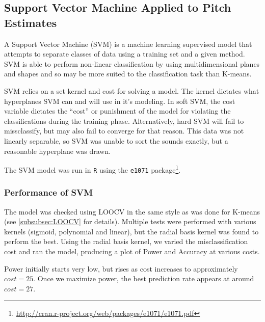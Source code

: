 \documentclass[paper=a4, fontsize=11pt]{scrartcl}
\numberwithin{equation}{section}
\numberwithin{figure}{section}
\numberwithin{table}{section}
\begin{document}
\subsection{Support Vector Machine Applied to Pitch Estimates}
A Support Vector Machine (SVM) is a machine learning supervised model that attempts to separate classes of data using a training set and a given method. SVM is able to perform non-linear classification by using multidimensional planes and shapes and so may be more suited to the classification task than K-means.

\noindent SVM relies on a set kernel and cost for solving a model. The kernel dictates what hyperplanes SVM can and will use in it's modeling. In soft SVM, the cost variable dictates the ``cost'' or punishment of the model for violating the classifications during the training phase. Alternatively, hard SVM will fail to missclassify, but may also fail to converge for that reason. This data was not linearly separable, so SVM was unable to sort the sounds exactly, but a reasonable hyperplane was drawn.

\noindent The SVM model was run in \texttt{R} using the \texttt{e1071} package\footnote{\url{http://cran.r-project.org/web/packages/e1071/e1071.pdf}}.

\subsubsection{Performance of SVM}
The model was checked using LOOCV in the same style as was done for K-means (see \ref{subsubsec:LOOCV} for details). Multiple tests were performed with various kernels (sigmoid, polynomial and linear), but the radial basis kernel was found to perform the best. Using the radial basis kernel, we varied the misclassification cost and ran the model, producing a plot of Power and Accuracy at various costs.

Power initially starts very low, but rises as cost increases to approximately $cost = 25$. Once we maximize power, the best prediction rate appears at around $cost = 27$.
\end{document}

